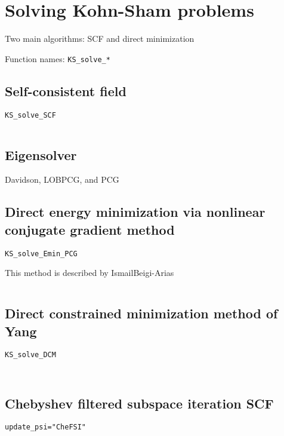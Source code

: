 \documentclass[a4paper,10pt]{paper}
\newcommand{\jlcode}[1]{\texttt{#1}}
\begin{document}
\section{Solving Kohn-Sham problems}

Two main algorithms: SCF and direct minimization

Function names: \jlcode{KS_solve_*}

\subsection{Self-consistent field}

\jlcode{KS_solve_SCF}

\inputminted[breaklines]{julia}{../src/KS_solve_SCF.jl}



\subsection{Eigensolver}

Davidson, LOBPCG, and PCG

\subsection{Direct energy minimization via nonlinear conjugate gradient method}

\jlcode{KS_solve_Emin_PCG}

This method is described by IsmailBeigi-Arias

\inputminted[breaklines]{julia}{../src/KS_solve_Emin_PCG.jl}


\subsection{Direct constrained minimization method of Yang}

\jlcode{KS_solve_DCM}

\inputminted[breaklines]{julia}{../src/KS_solve_DCM.jl}


\inputminted[breaklines]{julia}{../src/KS_solve_TRDCM.jl}


\subsection{Chebyshev filtered subspace iteration SCF}

\jlcode{update_psi="CheFSI"}

\inputminted[breaklines]{julia}{../src/CheFSI.jl}
\end{document}
